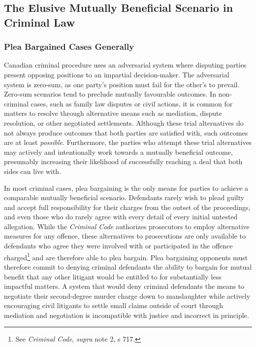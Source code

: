 \subsection{The Elusive Mutually Beneficial Scenario in Criminal Law}

\subsubsection{Plea Bargained Cases Generally}

Canadian criminal procedure uses an adversarial system where disputing parties present opposing positions to an impartial decision-maker. The adversarial system is zero-sum, as one party's position must fail for the other's to prevail. Zero-sum scenarios tend to preclude mutually favourable outcomes. In non-criminal cases, such as family law disputes or civil actions, it is common for matters to resolve through alternative means such as mediation, dispute resolution, or other negotiated settlements. Although these trial alternatives do not always produce outcomes that both parties are satisfied with, such outcomes are at least \textit{possible}. Furthermore, the parties who attempt these trial alternatives may actively and intentionally work towards a mutually beneficial outcome, presumably increasing their likelihood of successfully reaching a deal that both sides can live with.

In most criminal cases, plea bargaining is the only means for parties to achieve a comparable mutually beneficial scenario. Defendants rarely wish to plead guilty and accept full responsibility for their charges from the outset of the proceedings, and even those who do rarely agree with every detail of every initial untested allegation. While the \textit{Criminal Code} authorizes prosecutors to employ alternative measures for any offence, these alternatives to prosecutions are only available to defendants who agree they were involved with or participated in the offence charged\footnote{See \textit{Criminal Code}, \textit{supra} note 2, s 717.} and are therefore able to plea bargain. Plea bargaining opponents must therefore commit to denying criminal defendants the ability to bargain for mutual benefit that any other litigant would be entitled to for substantially less impactful matters. A system that would deny criminal defendants the means to negotiate their second-degree murder charge down to manslaughter while actively encouraging civil litigants to settle small claims outside of court through mediation and negotiation is incompatible with justice and incorrect in principle.

